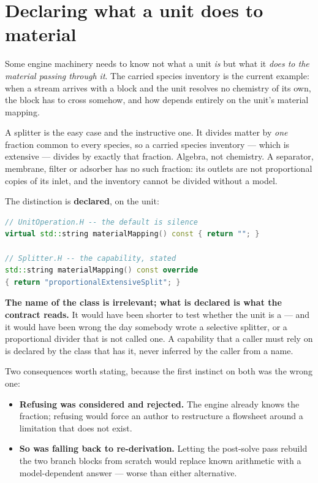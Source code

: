 \documentclass[11pt,a4paper]{article}
\begin{document}
\section{Declaring what a unit does to material}\label{sec:material-mapping}

Some engine machinery needs to know not what a unit \emph{is} but what it
\emph{does to the material passing through it}.  The carried species
inventory is the current example: when a stream arrives with a
 block and the unit resolves no chemistry of its own,
the block has to cross somehow, and how depends entirely on the unit's
material mapping.

A splitter is the easy case and the instructive one.  It divides matter by
\emph{one} fraction common to every species, so a carried species
inventory --- which is extensive --- divides by exactly that fraction.
Algebra, not chemistry.  A separator, membrane, filter or adsorber has no
such fraction: its outlets are not proportional copies of its inlet, and
the inventory cannot be divided without a model.

The distinction is \textbf{declared}, on the unit:

\begin{lstlisting}[language=C++]
// UnitOperation.H -- the default is silence
virtual std::string materialMapping() const { return ""; }

// Splitter.H -- the capability, stated
std::string materialMapping() const override
{ return "proportionalExtensiveSplit"; }
\end{lstlisting}

\begin{keyidea}
\textbf{The name of the class is irrelevant; what is declared is what the
contract reads.}  It would have been shorter to test whether the unit is a
 --- and it would have been wrong the day somebody wrote a
selective splitter, or a proportional divider that is not called one.  A
capability that a caller must rely on is declared by the class that has
it, never inferred by the caller from a name.
\end{keyidea}

Two consequences worth stating, because the first instinct on both was the
wrong one:

\begin{itemize}
\item \textbf{Refusing was considered and rejected.}  The engine already
      knows the fraction; refusing would force an author to restructure a
      flowsheet around a limitation that does not exist.
\item \textbf{So was falling back to re-derivation.}  Letting the
      post-solve pass rebuild the two branch blocks from scratch would
      replace known arithmetic with a model-dependent answer --- worse
      than either alternative.
\end{itemize}
\end{document}
